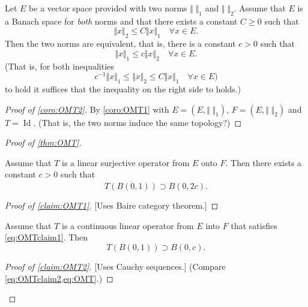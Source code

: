 \documentclass{article}
\theoremstyle{definition}
\numberwithin{equation}{section}
\DeclareMathOperator{\Id}{Id}
\begin{document}
	\begin{coro}\label{coro:OMT2}
		Let $E$ be a vector space provided with two norms $\Vert\;\Vert_1$ and $\Vert\;\Vert_2$. Assume that $E$ is a Banach space for \textit{both} norms and that there exists a constant $C\geq0$ such that
		\[\Vert x\Vert_2\leq C\Vert x\Vert_1\quad\forall x\in E.\]
		Then the two norms are equivalent, that is, there is a constant $c>0$ such that
		\[\Vert x\Vert_1\leq c\Vert x\Vert_2\quad\forall x\in E.\]
		(That is, for both inequalities
		\[c^{-1}\Vert x\Vert_1\leq \Vert x\Vert_2\leq C\Vert x\Vert_1\quad\forall x\in E)\]
		to hold it suffices that the inequality on the right side to holds.)
	\end{coro}
	\begin{proof}[Proof of \cref{coro:OMT2}]
		By \cref{coro:OMT1} with $E=(E,\Vert\;\Vert_1)$, $F=(E,\Vert\;\Vert_2)$ and $T=\Id$. (That is, the two norms induce the same topology?)
	\end{proof}
	\begin{proof}[Proof of \cref{thm:OMT}]
		\begin{claim}\label{claim:OMT1}
			Assume that $T$ is a linear surjective operator from $E$ onto $F$. Then there exists a constant $c>0$ such that
			\begin{equation}\label{eq:OMTclaim1}
				\overline{T(B(0,1))}\supset B(0,2c).
			\end{equation}
		\end{claim}
		\begin{proof}[Proof of \cref{claim:OMT1}]
			[Uses Baire category theorem.]
		\end{proof}
		\begin{claim}\label{claim:OMT2}
			Assume that $T$ is a continuous linear operator from $E$ into $F$ that satisfies \cref{eq:OMTclaim1}. Then
			\begin{equation}\label{eq:OMTclaim2}
				T(B(0,1))\supset B(0,c).
			\end{equation}
		\end{claim}
		\begin{proof}[Proof of \cref{claim:OMT2}]
			[Uses Cauchy sequences.] (Compare \cref{eq:OMTclaim2,eq:OMT}.)
		\end{proof}
	\end{proof}
	
\end{document}
